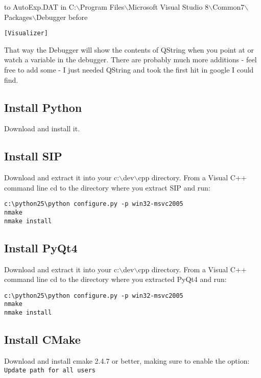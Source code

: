 to AutoExp.DAT in C:$\backslash$Program Files$\backslash$Microsoft Visual Studio 8$\backslash$Common7$\backslash$Packages$\backslash$Debugger before 

\begin{verbatim}
[Visualizer]
\end{verbatim}

That way the Debugger will show the contents of QString when you point at or
watch a variable in the debugger.  There are probably much more additions -
feel free to add some - I just needed QString and took the first hit in google
I could find.

\subsection{Install Python}
Download  and install it.

\subsection{Install SIP}
Download  and extract it 
into your c:$\backslash$dev$\backslash$cpp directory.
From a Visual C++ command line cd to the directory where you extract SIP and run:

\begin{verbatim}
c:\python25\python configure.py -p win32-msvc2005
nmake
nmake install
\end{verbatim}

\subsection{Install PyQt4}
Download  and extract it 
into your c:$\backslash$dev$\backslash$cpp directory.
From a Visual C++ command line cd to the directory where you extracted PyQt4 and run:

\begin{verbatim}
c:\python25\python configure.py -p win32-msvc2005
nmake
nmake install
\end{verbatim}

\subsection{Install CMake}
Download and install cmake 2.4.7 or better, making sure to enable the option: \texttt{Update path for all users}

